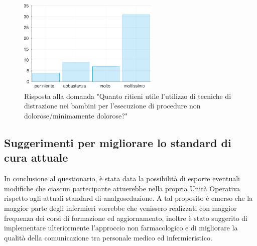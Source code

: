 \begin{figure}[!h]
    \centering
    \includegraphics[width=0.6\textwidth]{Figure/distrazione.pdf}
    \caption{Risposta alla domanda "Quanto ritieni utile l’utilizzo di tecniche di distrazione nei bambini per l’esecuzione di procedure non dolorose/minimamente dolorose?"}
    \label{fig:distrazione}
\end{figure}

\subsection*{Suggerimenti per migliorare lo standard di cura attuale}

In conclusione al questionario, è stata data la possibilità di esporre eventuali modifiche che ciascun partecipante attuerebbe nella propria Unità Operativa rispetto agli attuali standard di analgosedazione. A tal proposito è emerso che la maggior parte degli infermieri vorrebbe che venissero realizzati con maggior frequenza dei corsi di formazione ed aggiornamento, inoltre è stato suggerito di implementare ulteriormente l'approccio non farmacologico e di migliorare la qualità della comunicazione tra personale medico ed infermieristico. 